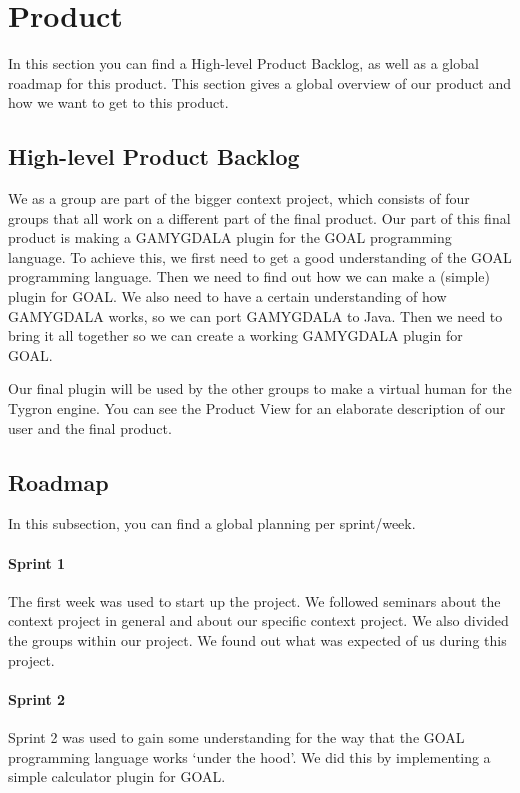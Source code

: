 \section{Product}
In this section you can find a High-level Product Backlog, as well as a global roadmap for this product. This section gives a global overview of our product and how we want to get to this product.

\subsection{High-level Product Backlog}
We as a group are part of the bigger context project, which consists of four groups that all work on a different part of the final product. Our part of this final product is making a \gls{GAMYGDALA} plugin for the \gls{GOAL} programming language. To achieve this, we first need to get a good understanding of the \gls{GOAL} programming language. Then we need to find out how we can make a (simple) plugin for \gls{GOAL}. We also need to have a certain understanding of how \gls{GAMYGDALA} works, so we can port \gls{GAMYGDALA} to Java. Then we need to bring it all together so we can create a working \gls{GAMYGDALA} plugin for \gls{GOAL}. \\ \par
Our final plugin will be used by the other groups to make a virtual human for the \gls{Tygron} engine. You can see the Product View for an elaborate description of our user and the final product.

\subsection{Roadmap}
In this subsection, you can find a global planning per sprint/week.

\paragraph{Sprint 1} The first week was used to start up the project. We followed seminars about the context project in general and about our specific context project. We also divided the groups within our project. We found out what was expected of us during this project.
\paragraph{Sprint 2} Sprint 2 was used to gain some understanding for the way that the \gls{GOAL} programming language works `under the hood'. We did this by implementing a simple calculator plugin for \gls{GOAL}.
